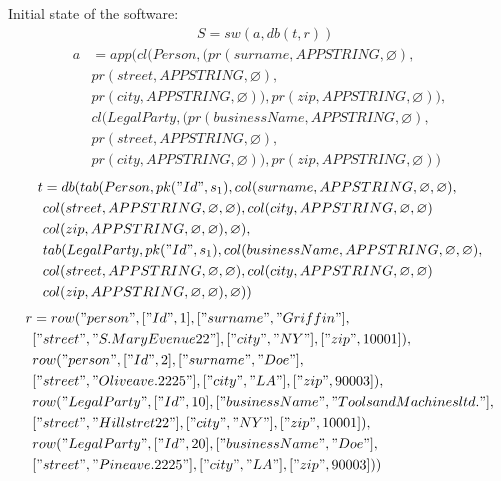 \documentclass[11pt]{article}
\begin{document}
\newpage
Initial state of the software:
\medskip
\hline
\begin{align*}
&	S = sw(a, db(t,r))
\end{align*}
\begin{align*}
a &= app(cl(Person, (pr(surname, APPSTRING, \varnothing), \\
& pr(street, APPSTRING, \varnothing), \\
& pr(city, APPSTRING, \varnothing)), pr(zip, APPSTRING, \varnothing)), \\
& cl(LegalParty, (pr(businessName, APPSTRING, \varnothing), \\
& pr(street, APPSTRING, \varnothing), \\
& pr(city, APPSTRING, \varnothing)), pr(zip, APPSTRING, \varnothing))
\end{align*}
\begin{align*}
t &= db(tab(Person, pk("Id", s_1), col(surname, APPSTRING, \varnothing, \varnothing), \\
& col(street, APPSTRING, \varnothing, \varnothing), col(city, APPSTRING, \varnothing, \varnothing) \\
& col(zip, APPSTRING, \varnothing, \varnothing), \varnothing), \\
& tab(LegalParty, pk("Id", s_1),  col(businessName, APPSTRING, \varnothing, \varnothing), \\
& col(street, APPSTRING, \varnothing, \varnothing), col(city, APPSTRING, \varnothing, \varnothing) \\
& col(zip, APPSTRING, \varnothing, \varnothing), \varnothing)) 
\end{align*}
\begin{align*}
r &= row("person", ["Id", 1], ["surname", "Griffin"], \\
& ["street", "S. Mary Evenue 22"], ["city", "NY"], ["zip", 10001]), \\
& row("person", ["Id", 2], ["surname", "Doe"], \\
& ["street", "Olive ave. 2225"], ["city", "LA"], ["zip", 90003]), \\
& row("LegalParty", ["Id", 10], ["businessName", "Tools and Machines ltd."], \\
& ["street", "Hill stret 22"], ["city", "NY"], ["zip", 10001]), \\
& row("LegalParty", ["Id", 20], ["businessName", "Doe"], \\
& ["street", "Pine ave. 2225"], ["city", "LA"], ["zip", 90003]))
\end{align*}
\end{document}
